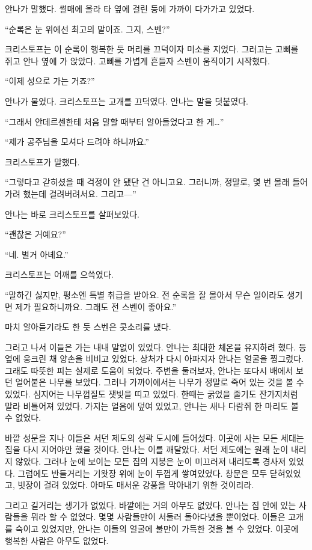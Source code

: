 안나가 말했다. 썰매에 올라 타 옆에 걸린 등에 가까이 다가가고 있었다.

``순록은 눈 위에선 최고의 말이죠. 그지, 스벤?''

크리스토프는 이 순록이 행복한 듯 머리를 끄덕이자 미소를 지었다. 그러고는 고삐를 쥐고 안나 옆에 가 앉았다. 고삐를 가볍게 흔들자 스벤이 움직이기 시작했다.

``이제 성으로 가는 거죠?''

안나가 물었다. 크리스토프는 고개를 끄덕였다. 안나는 말을 덧붙였다.

``그래서 안데르센한테 처음 말할 때부터 알아들었다고 한 게\ldots''

``제가 공주님을 모셔다 드려야 하니까요.''

크리스토프가 말했다.

``그렇다고 갇히셨을 때 걱정이 안 됐단 건 아니고요. 그러니까, 정말로, 몇 번 몰래 들어가려 했는데 걸려버려서요. 그리고—''

안나는 바로 크리스토프를 살펴보았다.

``괜찮은 거예요?''

``네. 별거 아녜요.''

크리스토프는 어깨를 으쓱였다.

``말하긴 싫지만, 평소엔 특별 취급을 받아요. 전 순록을 잘 몰아서 무슨 일이라도 생기면 제가 필요하니까요. 그래도 전 스벤이 좋아요.''

마치 알아듣기라도 한 듯 스벤은 콧소리를 냈다.

그러고 나서 이들은 가는 내내 말없이 있었다. 안나는 최대한 체온을 유지하려 했다. 등 옆에 웅크린 채 양손을 비비고 있었다. 상처가 다시 아파지자 안나는 얼굴을 찡그렸다. 그래도 따뜻한 피는 실제로 도움이 되었다. 주변을 둘러보자, 안나는 또다시 배에서 보던 얼어붙은 나무를 보았다. 그러나 가까이에서는 나무가 정말로 죽어 있는 것을 볼 수 있었다. 심지어는 나무껍질도 잿빛을 띠고 있었다. 한때는 굵었을 줄기도 잔가지처럼 말라 비틀어져 있었다. 가지는 얼음에 덮여 있었고, 안나는 새나 다람쥐 한 마리도 볼 수 없었다.

바깥 성문을 지나 이들은 서던 제도의 성곽 도시에 들어섰다. 이곳에 사는 모든 세대는 집을 다시 지어야만 했을 것이다. 안나는 이를 깨달았다. 서던 제도에는 원래 눈이 내리지 않았다. 그러나 눈에 보이는 모든 집의 지붕은 눈이 미끄러져 내리도록 경사져 있었다. 그럼에도 반들거리는 기왓장 위에 눈이 두껍게 쌓여있었다. 창문은 모두 닫혀있었고, 빗장이 걸려 있었다. 아마도 매서운 강풍을 막아내기 위한 것이리라.

그리고 길거리는 생기가 없었다. 바깥에는 거의 아무도 없었다. 안나는 집 안에 있는 사람들을 뭐라 할 수 없었다. 몇몇 사람들만이 서둘러 돌아다녔을 뿐이었다. 이들은 고개를 숙이고 있었지만, 안나는 이들의 얼굴에 불만이 가득한 것을 볼 수 있었다. 이곳에 행복한 사람은 아무도 없었다.

